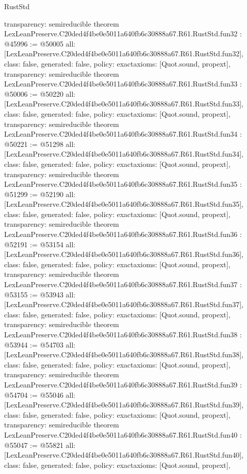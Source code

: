 \begin{lexlean}{RustStd}
\begin{coremodule}
{  transparency: semireducible
}
theorem LexLeanPreserve.C20ded4f4be0e5011a640fb6c30888a67.R61.RustStd.fun32 : @45996 := @50005 {
  all: [LexLeanPreserve.C20ded4f4be0e5011a640fb6c30888a67.R61.RustStd.fun32],
  class: false,
  generated: false,
  policy: exact{axioms: [Quot.sound, propext]},
  transparency: semireducible
}
theorem LexLeanPreserve.C20ded4f4be0e5011a640fb6c30888a67.R61.RustStd.fun33 : @50006 := @50220 {
  all: [LexLeanPreserve.C20ded4f4be0e5011a640fb6c30888a67.R61.RustStd.fun33],
  class: false,
  generated: false,
  policy: exact{axioms: [Quot.sound, propext]},
  transparency: semireducible
}
theorem LexLeanPreserve.C20ded4f4be0e5011a640fb6c30888a67.R61.RustStd.fun34 : @50221 := @51298 {
  all: [LexLeanPreserve.C20ded4f4be0e5011a640fb6c30888a67.R61.RustStd.fun34],
  class: false,
  generated: false,
  policy: exact{axioms: [Quot.sound, propext]},
  transparency: semireducible
}
theorem LexLeanPreserve.C20ded4f4be0e5011a640fb6c30888a67.R61.RustStd.fun35 : @51299 := @52190 {
  all: [LexLeanPreserve.C20ded4f4be0e5011a640fb6c30888a67.R61.RustStd.fun35],
  class: false,
  generated: false,
  policy: exact{axioms: [Quot.sound, propext]},
  transparency: semireducible
}
theorem LexLeanPreserve.C20ded4f4be0e5011a640fb6c30888a67.R61.RustStd.fun36 : @52191 := @53154 {
  all: [LexLeanPreserve.C20ded4f4be0e5011a640fb6c30888a67.R61.RustStd.fun36],
  class: false,
  generated: false,
  policy: exact{axioms: [Quot.sound, propext]},
  transparency: semireducible
}
theorem LexLeanPreserve.C20ded4f4be0e5011a640fb6c30888a67.R61.RustStd.fun37 : @53155 := @53943 {
  all: [LexLeanPreserve.C20ded4f4be0e5011a640fb6c30888a67.R61.RustStd.fun37],
  class: false,
  generated: false,
  policy: exact{axioms: [Quot.sound, propext]},
  transparency: semireducible
}
theorem LexLeanPreserve.C20ded4f4be0e5011a640fb6c30888a67.R61.RustStd.fun38 : @53944 := @54703 {
  all: [LexLeanPreserve.C20ded4f4be0e5011a640fb6c30888a67.R61.RustStd.fun38],
  class: false,
  generated: false,
  policy: exact{axioms: [Quot.sound, propext]},
  transparency: semireducible
}
theorem LexLeanPreserve.C20ded4f4be0e5011a640fb6c30888a67.R61.RustStd.fun39 : @54704 := @55046 {
  all: [LexLeanPreserve.C20ded4f4be0e5011a640fb6c30888a67.R61.RustStd.fun39],
  class: false,
  generated: false,
  policy: exact{axioms: [Quot.sound, propext]},
  transparency: semireducible
}
theorem LexLeanPreserve.C20ded4f4be0e5011a640fb6c30888a67.R61.RustStd.fun40 : @55047 := @55821 {
  all: [LexLeanPreserve.C20ded4f4be0e5011a640fb6c30888a67.R61.RustStd.fun40],
  class: false,
  generated: false,
  policy: exact{axioms: [Quot.sound, propext]},
}
\end{coremodule}
\end{lexlean}
